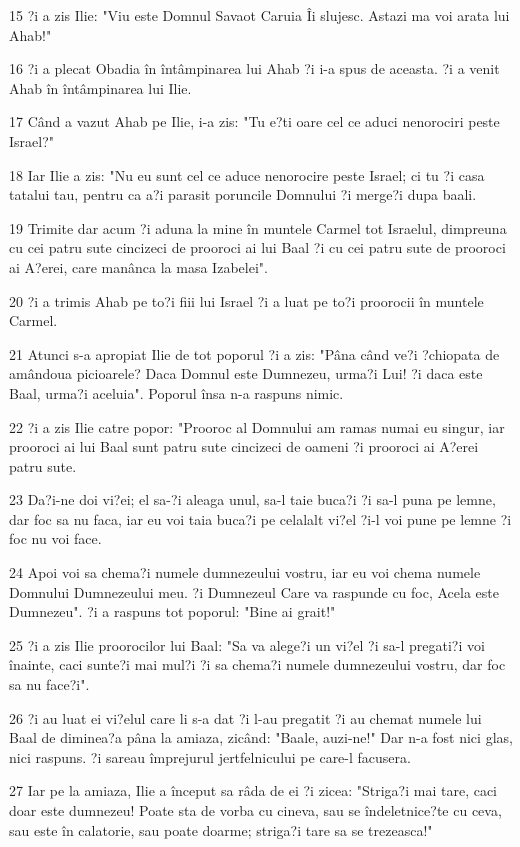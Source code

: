 \par 15 ?i a zis Ilie: "Viu este Domnul Savaot Caruia Îi slujesc. Astazi ma voi arata lui Ahab!"
\par 16 ?i a plecat Obadia în întâmpinarea lui Ahab ?i i-a spus de aceasta. ?i a venit Ahab în întâmpinarea lui Ilie.
\par 17 Când a vazut Ahab pe Ilie, i-a zis: "Tu e?ti oare cel ce aduci nenorociri peste Israel?"
\par 18 Iar Ilie a zis: "Nu eu sunt cel ce aduce nenorocire peste Israel; ci tu ?i casa tatalui tau, pentru ca a?i parasit poruncile Domnului ?i merge?i dupa baali.
\par 19 Trimite dar acum ?i aduna la mine în muntele Carmel tot Israelul, dimpreuna cu cei patru sute cincizeci de prooroci ai lui Baal ?i cu cei patru sute de prooroci ai A?erei, care manânca la masa Izabelei".
\par 20 ?i a trimis Ahab pe to?i fiii lui Israel ?i a luat pe to?i proorocii în muntele Carmel.
\par 21 Atunci s-a apropiat Ilie de tot poporul ?i a zis: "Pâna când ve?i ?chiopata de amândoua picioarele? Daca Domnul este Dumnezeu, urma?i Lui! ?i daca este Baal, urma?i aceluia". Poporul însa n-a raspuns nimic.
\par 22 ?i a zis Ilie catre popor: "Prooroc al Domnului am ramas numai eu singur, iar prooroci ai lui Baal sunt patru sute cincizeci de oameni ?i prooroci ai A?erei patru sute.
\par 23 Da?i-ne doi vi?ei; el sa-?i aleaga unul, sa-l taie buca?i ?i sa-l puna pe lemne, dar foc sa nu faca, iar eu voi taia buca?i pe celalalt vi?el ?i-l voi pune pe lemne ?i foc nu voi face.
\par 24 Apoi voi sa chema?i numele dumnezeului vostru, iar eu voi chema numele Domnului Dumnezeului meu. ?i Dumnezeul Care va raspunde cu foc, Acela este Dumnezeu". ?i a raspuns tot poporul: "Bine ai grait!"
\par 25 ?i a zis Ilie proorocilor lui Baal: "Sa va alege?i un vi?el ?i sa-l pregati?i voi înainte, caci sunte?i mai mul?i ?i sa chema?i numele dumnezeului vostru, dar foc sa nu face?i".
\par 26 ?i au luat ei vi?elul care li s-a dat ?i l-au pregatit ?i au chemat numele lui Baal de diminea?a pâna la amiaza, zicând: "Baale, auzi-ne!" Dar n-a fost nici glas, nici raspuns. ?i sareau împrejurul jertfelnicului pe care-l facusera.
\par 27 Iar pe la amiaza, Ilie a început sa râda de ei ?i zicea: "Striga?i mai tare, caci doar este dumnezeu! Poate sta de vorba cu cineva, sau se îndeletnice?te cu ceva, sau este în calatorie, sau poate doarme; striga?i tare sa se trezeasca!"
